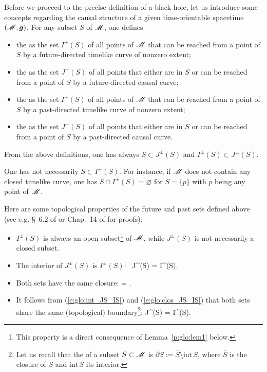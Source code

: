 Before we proceed to the precise definition of a black hole, let us introduce
some concepts regarding the causal structure of a given time-orientable spacetime $(\mathscr{M},\bm{g})$.
For any subset $S$ of $\mathscr{M}$, one defines
\begin{itemize}
\item the  as the set $I^+(S)$ of all
points of $\mathscr{M}$ that can be reached from a point of $S$ by a future-directed
timelike curve of nonzero extent;
\item the  as the set $J^+(S)$ of
all points that either are in $S$ or can be reached from a point of $S$ by a future-directed
causal curve;
\item the  as the set $I^-(S)$ of all
points of $\mathscr{M}$ that can be reached from a point of $S$ by a past-directed
timelike curve of nonzero extent;
\item the  as the set $J^-(S)$ of
all points that either are in $S$ or can be reached from a point of $S$ by a past-directed
causal curve.
\end{itemize}
From the above definitions, one has always $S \subset J^\pm(S)$ and
$I^\pm(S) \subset J^\pm(S)$.

\begin{remark}
One has not necessarily $S \subset I^\pm(S)$. For instance,
if $\mathscr{M}$ does not contain
any closed timelike curve, one has  $S \cap I^\pm(S) = \varnothing$ for
$S = \{p\}$ with $p$ being any point of $\mathscr{M}$.
\end{remark}

Here are some topological properties of the future and past sets
defined above (see e.g. \S~6.2 of \cite{HawkiE73} or Chap.~14 of
\cite{ONeil83} for proofs):
\begin{itemize}
\item
$I^\pm(S)$ is always an open subset\footnote{This property is a direct
consequence of Lemma~\ref{p:glo:lem1} below.} of $\mathscr{M}$, while
$J^\pm(S)$ is not necessarily a closed subset.
\item The interior of $J^\pm(S)$ is $I^\pm(S)$:
\be \label{e:glo:int_JS_IS}
    \, J^\pm(S) = I^\pm(S).
\ee
\item Both sets have the same closure:
\be \label{e:glo:clos_JS_IS}
     =  .
\ee
\item
It follows from (\ref{e:glo:int_JS_IS}) and (\ref{e:glo:clos_JS_IS})
that both sets share the same (topological) boundary\footnote{\label{ft:glo:top_boundary}Let us recall that the  of a subset $S\subset \mathscr{M}$ is
$\partial S := \overline{S} \setminus \mathrm{int}\, S$, where $\overline{S}$ is the closure
of $S$ and $\mathrm{int}\, S$ its interior.}:
\be \label{e:glo:boundary_JS_IS}
    \partial J^\pm(S) = \partial I^\pm(S).
\ee
\end{itemize}

